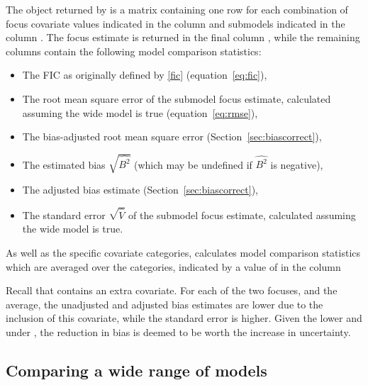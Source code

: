 \documentclass[article,shortnames,nojss,nofooter]{jss}\usepackage[]{graphicx}\usepackage[]{color}
\begin{document}
The object returned by  is a matrix containing one row for
each combination of focus covariate values indicated in the column  and submodels indicated in the column .   The focus estimate is returned in the final column , while the remaining columns contain the following model comparison statistics:
\begin{itemize}
\item {} The FIC as originally defined by \ref{fic} (equation~\ref{eq:fic}),
\item {} The root mean square error of the submodel focus
  estimate, calculated assuming the wide model is true (equation~\ref{eq:rmse}),
\item {} The bias-adjusted root mean square error (Section~\ref{sec:biascorrect}),
\item {} The estimated bias $\sqrt{\widehat{B^2}}$ (which may be undefined if $\widehat{B^2}$ is negative),
\item {} The adjusted bias estimate (Section~\ref{sec:biascorrect}),
\item {} The standard error $\sqrt{\hat{V}}$ of
  the submodel focus estimate, calculated assuming the wide model is true.
\end{itemize}

As well as the specific covariate categories,  calculates 
model comparison statistics which are averaged over the categories, indicated by a value of  in the column 

Recall that  contains an extra covariate.  For each of the
two focuses, and the average, the unadjusted and adjusted bias
estimates are lower due to the inclusion of this covariate, while the
standard error  is higher.  Given the lower  and
 under , the reduction in bias is deemed to
be worth the increase in uncertainty.


\subsection{Comparing a wide range of models }
\end{document}
